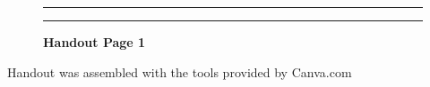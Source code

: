 \documentclass[]{article}
\begin{document}
\begin{figure}[!ht]
    \hrule
    \caption{ \textbf{Handout Page 1} }
    \begin{center}
    \end{center}
    \label{fig:handout-1}
    \hrule
\end{figure}

Handout was assembled with the tools provided by Canva.com

\newpage
\end{document}
